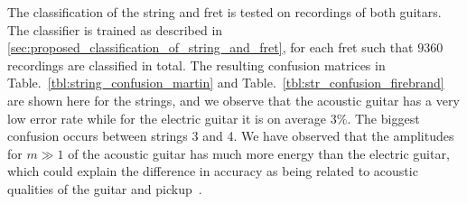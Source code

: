 \documentclass{article}
\begin{document}
%
%
%
%
%
%    
%
%
%
%
\label{sec:string_fret_classification}
The classification of the string and fret is tested on recordings of both guitars. 
The classifier is trained as described in \ref{sec:proposed_classification_of_string_and_fret}, for each fret such that %
$9360$ recordings are classified in total. The resulting confusion matrices in Table.~\ref{tbl:string_confusion_martin} and Table.~\ref{tbl:str_confusion_firebrand} are shown here for the strings, and we observe that the acoustic guitar has a very low error rate while for the electric guitar it is on average $3\%$. The biggest confusion occurs between strings 3 and 4. We have observed that the amplitudes for $m\!\!\gg\!\!1$ of the acoustic guitar has much more energy than the electric guitar, which could explain the difference in accuracy as being related to acoustic qualities of the guitar and pickup~\cite{fletcher:physics_of_musical_instruments}.  
\end{document}
